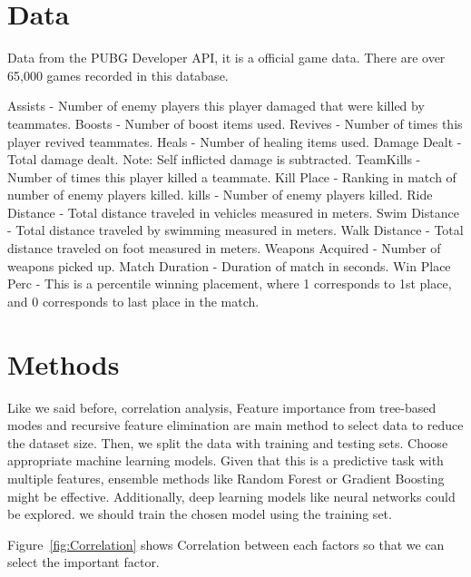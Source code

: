 \documentclass[12pt]{article}
\begin{document}
\section{Data}
\label{sec:data}

Data from the PUBG Developer API, it  is a official game data. There are over 65,000 games recorded in this database.  

Assists - 			Number of enemy players this player damaged that were killed by teammates.
Boosts -          		Number of boost items used.
Revives - 	     		Number of times this player revived teammates.
Heals - 	     		Number of healing items used.
Damage Dealt - 		Total damage dealt. Note: Self inflicted damage is subtracted.
TeamKills - 		Number of times this player killed a teammate.
Kill Place - 		Ranking in match of number of enemy players killed.
kills - 			Number of enemy players killed.
Ride Distance - 		Total distance traveled in vehicles measured in meters.
Swim Distance - 	Total distance traveled by swimming measured in meters.
Walk Distance - 	Total distance traveled on foot measured in meters.
Weapons Acquired - 	Number of weapons picked up.
Match Duration - 	Duration of match in seconds.
Win Place Perc -  	This is a percentile winning placement, where 1 corresponds to 1st place, and 0 corresponds to last place in the match.




\section{Methods}
\label{sec:meth}

Like we  said before,  correlation analysis, Feature importance from tree-based modes and recursive feature elimination are main method to select data to reduce the dataset size. Then, we split the data with training and testing sets. Choose appropriate machine learning models. Given that this is a predictive task with multiple features, ensemble methods like Random Forest or Gradient Boosting might be effective. Additionally, deep learning models like neural networks could be explored. we should train the chosen model using the training set.


Figure~\ref{fig:Correlation} shows Correlation between each factors so that we can select the important factor. 
\end{document}
